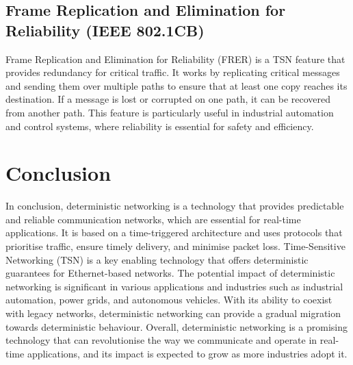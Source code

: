 \documentclass[runningheads]{llncs}
\begin{document}
\subsection*{Frame Replication and Elimination for Reliability (IEEE 802.1CB)}
Frame Replication and Elimination for Reliability (FRER) is a TSN feature that provides redundancy for critical traffic. It works by replicating critical messages and sending them over multiple paths to ensure that at least one copy reaches its destination. If a message is lost or corrupted on one path, it can be recovered from another path. This feature is particularly useful in industrial automation and control systems, where reliability is essential for safety and efficiency.

\section{Conclusion}
In conclusion, deterministic networking is a technology that provides predictable and reliable communication networks, which are essential for real-time applications. It is based on a time-triggered architecture and uses protocols that prioritise traffic, ensure timely delivery, and minimise packet loss. Time-Sensitive Networking (TSN) is a key enabling technology that offers deterministic guarantees for Ethernet-based networks. The potential impact of deterministic networking is significant in various applications and industries such as industrial automation, power grids, and autonomous vehicles. With its ability to coexist with legacy networks, deterministic networking can provide a gradual migration towards deterministic behaviour. Overall, deterministic networking is a promising technology that can revolutionise the way we communicate and operate in real-time applications, and its impact is expected to grow as more industries adopt it.

\printnoidxglossary[type=acronym,sort=letter,title=Abbreviations]



\end{document}
